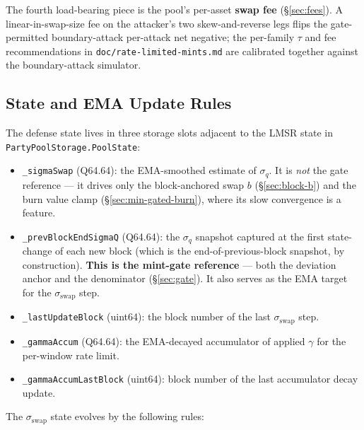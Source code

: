 \documentclass[11pt]{article}
\begin{document}
The fourth load-bearing piece is the pool's per-asset \textbf{swap
fee} (\S\ref{sec:fees}). A linear-in-swap-size fee on the attacker's
two skew-and-reverse legs flips the gate-permitted boundary-attack
per-attack net negative; the per-family $\tau$ and fee
recommendations in \texttt{doc/rate-limited-mints.md} are calibrated
together against the boundary-attack simulator.

\subsection{State and EMA Update Rules}
\label{sec:sigma-swap}

The defense state lives in three storage slots adjacent to the LMSR
state in \texttt{PartyPoolStorage.PoolState}:

\begin{itemize}
  \item \texttt{\_sigmaSwap} (Q64.64): the EMA-smoothed estimate of
        $\sigma_q$. It is \emph{not} the gate reference --- it drives
        only the block-anchored swap $b$ (\S\ref{sec:block-b}) and the
        burn value clamp (\S\ref{sec:min-gated-burn}), where its slow
        convergence is a feature.
  \item \texttt{\_prevBlockEndSigmaQ} (Q64.64): the $\sigma_q$ snapshot
        captured at the first state-change of each new block (which is
        the end-of-previous-block snapshot, by construction). \textbf{This
        is the mint-gate reference} --- both the deviation anchor and the
        denominator (\S\ref{sec:gate}). It also serves as the EMA target
        for the $\sigma_{\mathrm{swap}}$ step.
  \item \texttt{\_lastUpdateBlock} (uint64): the block number of the
        last $\sigma_{\mathrm{swap}}$ step.
  \item \texttt{\_gammaAccum} (Q64.64): the EMA-decayed accumulator of
        applied $\gamma$ for the per-window rate limit.
  \item \texttt{\_gammaAccumLastBlock} (uint64): block number of the
        last accumulator decay update.
\end{itemize}

The $\sigma_{\mathrm{swap}}$ state evolves by the following rules:
\end{document}
